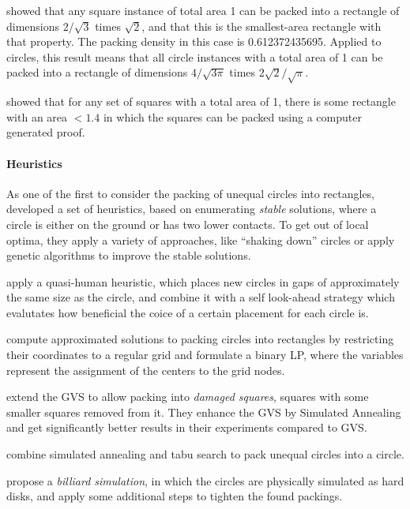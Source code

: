 \textcite{KK1975optimal} showed that any square instance of total area 1 can be packed into a rectangle of dimensions $2/\sqrt{3}$ times $\sqrt{2}$, and that this is the smallest-area rectangle with that property. The packing density in this case is 0.612372435695. Applied to circles, this result means that all circle instances with a total area of 1 can be packed into a rectangle of dimensions $4/\sqrt{3\pi}$ times $2\sqrt{2}/\sqrt{\pi}$.

\textcite{hougardy2011packing} showed that for any set of squares with a total area of 1, there is some rectangle with an area $< 1.4$ in which the squares can be packed using a computer generated proof.


\paragraph{Heuristics}

As one of the first to consider the packing of unequal circles into rectangles, \textcite{GGL1995packing} developed a set of heuristics, based on enumerating \emph{stable} solutions, where a circle is either on the ground or has two lower contacts. To get out of local optima, they apply a variety of approaches, like “shaking down” circles or apply genetic algorithms to improve the stable solutions.

\textcite{HLLX2006new} apply a quasi-human heuristic, which places new circles in gaps of approximately the same size as the circle, and combine it with a self look-ahead strategy which evalutates how beneficial the coice of a certain placement for each circle is.

\textcite{LIE2014approximate} compute approximated solutions to packing circles into rectangles by restricting their coordinates to a regular grid and formulate a binary LP, where the variables represent the assignment of the centers to the grid nodes.

\textcite{ZYC2015packing} extend the GVS to allow packing into \emph{damaged squares}, squares with some smaller squares removed from it. They enhance the GVS by Simulated Annealing and get significantly better results in their experiments compared to GVS.

\textcite{ZD2005effective} combine simulated annealing and tabu search to pack unequal circles into a circle.

\textcite{GLNO1998dense} propose a \emph{billiard simulation}, in which the circles are physically simulated as hard disks, and apply some additional steps to tighten the found packings.

